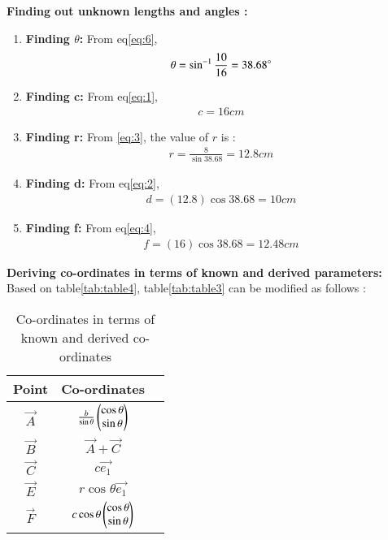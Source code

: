 \textbf{Finding out unknown lengths and angles :}\\
\begin{enumerate}
	\item \textbf{Finding $\theta$:}
		From eq\ref{eq:6},
		\begin{align}
			\theta = \sin^{-1}\frac{10}{16} = 38.68\degree
			\label{eq:7}
		\end{align}
	\item \textbf{Finding c:}
		From eq\ref{eq:1},
		\begin{align}
			c = 16cm
			\label{eq:8}
		\end{align}
	\item \textbf{Finding r:}
		From \ref{eq:3}, the value of $r$ is :
		\begin{align}
			r = \frac{8}{\sin{38.68}} = 12.8cm
			\label{eq:9}
		\end{align}
	\item \textbf{Finding d:}
		From eq\ref{eq:2},
		\begin{align}
			d = (12.8)\cos{38.68} = 10cm
			\label{eq:10}
		\end{align}
	\item \textbf{Finding f:}
		From eq\ref{eq:4},
		\begin{align}
			f = (16)\cos{38.68} = 12.48cm
			\label{eq:11}
		\end{align}
\end{enumerate}
\textbf{Deriving co-ordinates in terms of known and derived parameters:}\\
Based on table\ref{tab:table4}, table\ref{tab:table3} can be modified as follows :\\
\begin{table}[h]
	\centering
\begin{tabular}{|c|c|c|}
\hline
Point & Co-ordinates\\
\hline
$\vec{A}$ & $\frac{b}{\sin{\theta}}\begin{pmatrix}\cos{\theta}\\\sin{\theta}\end{pmatrix}$\\
\hline
$\vec{B}$ & $\vec{A} + \vec{C}$\\
\hline
$\vec{C}$ & $c\vec{e_1}$\\
\hline
$\vec{E}$ & $r\cos{\theta}\vec{e_1}$\\
\hline
$\vec{F}$ & $c\cos{\theta}\begin{pmatrix}\cos{\theta}\\\sin{\theta}\end{pmatrix}$\\
\hline
\end{tabular}
	\caption{Co-ordinates in terms of known and derived co-ordinates}
	\label{tab:table5}
\end{table}\\

